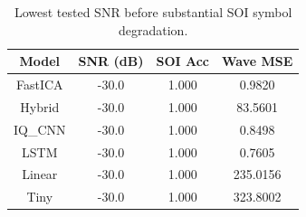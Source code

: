 \begin{table}[t]
\centering
\caption{Lowest tested SNR before substantial SOI symbol degradation.}
\label{tab:noise_robustness}
\begin{tabular}{|c|c|c|c|}
\hline
Model & SNR (dB) & SOI Acc & Wave MSE \\ 
\hline
FastICA & -30.0 & 1.000 & 0.9820 \\ 
Hybrid & -30.0 & 1.000 & 83.5601 \\ 
IQ\_CNN & -30.0 & 1.000 & 0.8498 \\ 
LSTM & -30.0 & 1.000 & 0.7605 \\ 
Linear & -30.0 & 1.000 & 235.0156 \\ 
Tiny & -30.0 & 1.000 & 323.8002 \\ 
\hline
\end{tabular}
\end{table}
